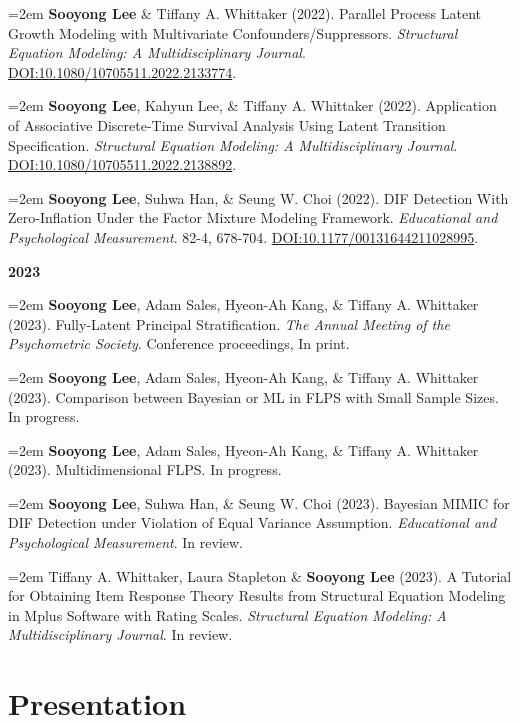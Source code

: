 \documentclass[11pt,a4paper,]{awesome-me}
\begin{document}
\hangindent=2em  \textbf{Sooyong Lee} \& Tiffany A.
Whittaker (2022). Parallel Process Latent Growth Modeling with
Multivariate Confounders/Suppressors. \emph{Structural Equation
Modeling: A Multidisciplinary Journal}.
\url{DOI:10.1080/10705511.2022.2133774}.

\hangindent=2em  \textbf{Sooyong Lee}, Kahyun Lee, \&
Tiffany A. Whittaker (2022). Application of Associative Discrete-Time
Survival Analysis Using Latent Transition Specification.
\emph{Structural Equation Modeling: A Multidisciplinary Journal}.
\url{DOI:10.1080/10705511.2022.2138892}.

\hangindent=2em  \textbf{Sooyong Lee}, Suhwa Han, \& Seung
W. Choi (2022). DIF Detection With Zero-Inflation Under the Factor
Mixture Modeling Framework. \emph{Educational and Psychological
Measurement}. 82-4, 678-704. \url{DOI:10.1177/00131644211028995}.

\setlength{\leftskip}{0cm}

\textbf{2023}

\setlength{\leftskip}{0.5cm}

\hangindent=2em  \textbf{Sooyong Lee}, Adam Sales, Hyeon-Ah
Kang, \& Tiffany A. Whittaker (2023). Fully-Latent Principal
Stratification. \emph{The Annual Meeting of the Psychometric Society}.
Conference proceedings, In print.

\hangindent=2em  \textbf{Sooyong Lee}, Adam Sales, Hyeon-Ah
Kang, \& Tiffany A. Whittaker (2023). Comparison between Bayesian or ML
in FLPS with Small Sample Sizes. In progress.

\hangindent=2em  \textbf{Sooyong Lee}, Adam Sales, Hyeon-Ah
Kang, \& Tiffany A. Whittaker (2023). Multidimensional FLPS. In
progress.

\hangindent=2em  \textbf{Sooyong Lee}, Suhwa Han, \& Seung
W. Choi (2023). Bayesian MIMIC for DIF Detection under Violation of
Equal Variance Assumption. \emph{Educational and Psychological
Measurement}. In review.

\hangindent=2em  Tiffany A. Whittaker, Laura Stapleton \&
\textbf{Sooyong Lee} (2023). A Tutorial for Obtaining Item Response
Theory Results from Structural Equation Modeling in Mplus Software with
Rating Scales. \emph{Structural Equation Modeling: A Multidisciplinary
Journal}. In review.

\setlength{\leftskip}{0cm}

\hypertarget{presentation}{%
\section{Presentation}\label{presentation}}
\end{document}
